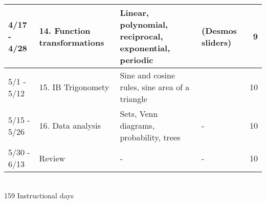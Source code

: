 \begin{tabular}{|p{2.9cm}|p{4.7cm}|p{8cm}|p{5cm}|r|}
  4/17 - 4/28 & 14. Function transformations & Linear, polynomial, reciprocal, exponential, periodic & (Desmos sliders) & 9 \\
  \hline
  5/1 - 5/12 & 15. IB Trigonomety & Sine and cosine rules, sine area of a triangle & & 10 \\
  \hline
  5/15 - 5/26 & 16. Data analysis & Sets, Venn diagrams, probability, trees & - & 10 \\
  \hline
  5/30 - 6/13 & Review & - & - & 10 \\
  \hline
\end{tabular} \\[0.25cm]
159 Instructional days


